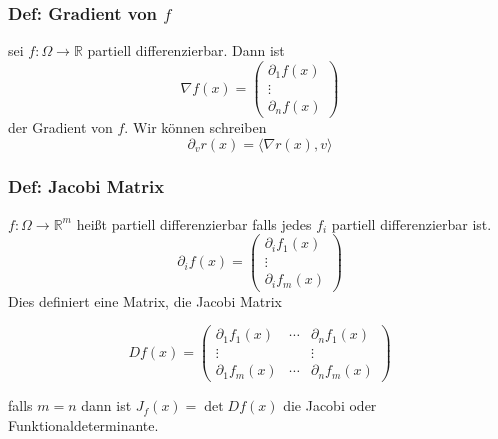 \subsubsection{Def: Gradient von $f$}
sei $f:\Omega\rightarrow\mathbb R$ partiell differenzierbar. Dann ist
\begin{equation}
	\nabla f(x) =
	\begin{pmatrix}
		\partial_1 f(x)\\
		\vdots\\
		\partial_n f(x)
	\end{pmatrix}
\end{equation}
der Gradient von $f$. Wir können schreiben
$$
\partial_v r(x) = \langle \nabla r(x), v\rangle
$$

\subsubsection{Def: Jacobi Matrix}
$f:\Omega\rightarrow \mathbb R^m$ heißt partiell differenzierbar falls jedes $f_i$ partiell differenzierbar ist.
\begin{equation}
	\partial_i f(x) =
	\begin{pmatrix}
		\partial_i f_1(x)\\
		\vdots\\
		\partial_i f_m(x)
	\end{pmatrix}
\end{equation}
Dies definiert eine Matrix, die Jacobi Matrix

\begin{equation}
	Df(x) =
	\begin{pmatrix}
		\partial_1 f_1(x) & \cdots & \partial_n f_1(x)\\
		\vdots  & & \vdots\\
		\partial_1 f_m(x) & \cdots & \partial_n f_m(x)
	\end{pmatrix}
\end{equation}

falls $m=n$ dann ist $J_f(x) = \det Df(x)$ die Jacobi oder Funktionaldeterminante.








